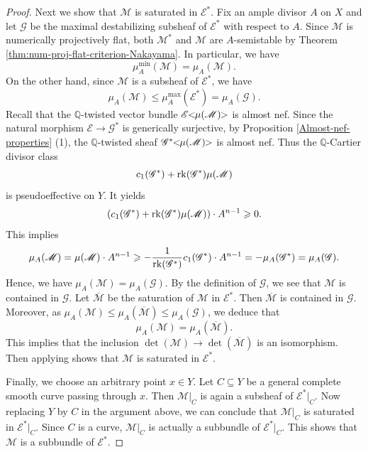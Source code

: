 \documentclass[english,reqno]{amsart}
\newcommand\bbQ{{\mathbb Q}}
\newcommand\sE{{\mathscr E}}
\newcommand\sG{{\mathscr G}}
\newcommand\sM{{\mathscr M}}
\newcommand{\rk}{{\rm rk}}
\theoremstyle{plain}
\theoremstyle{definition}
\numberwithin{equation}{section} %
\begin{document}
\begin{proof}
    Next we  show that $\sM$ is saturated in $\sE^*$. Fix an ample divisor $A$ on $X$ and let $\sG$ be the maximal  destabilizing subsheaf of $\sE^*$ with respect to $A$. Since $\sM$ is numerically projectively flat, both $\sM^*$ and $\sM$ are $A$-semistable by Theorem \ref{thm:num-proj-flat-criterion-Nakayama}. In particular, we have
    \[\mu_{A}^{\min}(\sM)=\mu_A(\sM).\]
    On the other hand, since $\sM$ is a subsheaf of $\sE^*$, we have
    \[\mu_A(\sM)\leqslant \mu_A^{\max}(\sE^*)=\mu_A(\sG).\]
    Recall that the $\bbQ$-twisted vector bundle $\sE\hspace{-0.8ex}<\hspace{-0.8ex} \mu(\sM) \hspace{-0.8ex}>$ is almost nef.
    Since the  natural morphism $\sE\rightarrow \sG^*$ is generically surjective, by Proposition \ref{Almost-nef-properties} (1),   the $\bbQ$-twisted  sheaf $\sG^*\hspace{-0.8ex}<\hspace{-0.8ex} \mu(\sM) \hspace{-0.8ex}>$ is almost nef. Thus the $\bbQ$-Cartier divisor class
    \[
    c_1(\sG^*)+\rk(\sG^*)\mu(\sM)
    \]
    is pseudoeffective on $Y$.  It yields
    $$
    (c_1(\sG^*)+\rk(\sG^*)\mu(\sM))\cdot A^{n-1} \geqslant 0.
    $$  
    This implies
    \[
    \mu_A(\sM)=\mu(\sM)\cdot A^{n-1}\geqslant -\frac{1}{\rk(\sG^*)}c_1(\sG^*)\cdot A^{n-1}= -\mu_A(\sG^*)=\mu_A(\sG).
    \]
    Hence, we have $\mu_A(\sM)=\mu_A(\sG)$. By the definition of $\sG$, we see that $\sM$ is contained in $\sG$. Let $\overline{\sM}$ be the saturation of $\sM$ in $\sE^*$. Then  $\overline{\sM}$ is   contained in $\sG$. Moreover, as $\mu_A(\sM)\leqslant \mu_A(\overline{\sM})\leqslant \mu_A(\sG)$, we deduce that
    \[\mu_A(\sM)=\mu_A(\overline{\sM}).\]
    This implies that  the inclusion $\det(\sM)\rightarrow \det(\overline{\sM})$ is an isomorphism. Then   applying \cite[Lemma 1.20]{DemaillyPeternellSchneider1994} shows that $\sM$ is saturated in $\sE^*$.

    Finally, we choose an arbitrary point $x\in Y$. Let $C\subseteq Y$ be a general complete smooth curve passing through $x$. Then $\sM\vert_C$ is again a subsheaf of $\sE^*\vert_C$.
     Now replacing $Y$ by $C$ in the argument above, we can conclude that $\sM\vert_C$ is saturated in $\sE^*\vert_C$.
     Since $C$ is a curve, $\sM\vert_C$ is actually a subbundle of $\sE^*\vert_C$. This shows that  $\sM$ is a subbundle of $\sE^*$.
\end{proof}
\end{document}
